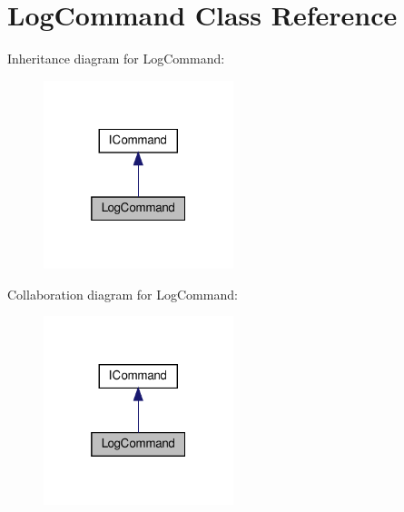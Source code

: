 \hypertarget{classLogCommand}{}\section{Log\+Command Class Reference}
\label{classLogCommand}


Inheritance diagram for Log\+Command\+:\nopagebreak
\begin{figure}[H]
\begin{center}
\leavevmode
\includegraphics[width=157pt]{classLogCommand__inherit__graph}
\end{center}
\end{figure}


Collaboration diagram for Log\+Command\+:\nopagebreak
\begin{figure}[H]
\begin{center}
\leavevmode
\includegraphics[width=157pt]{classLogCommand__coll__graph}
\end{center}
\end{figure}

